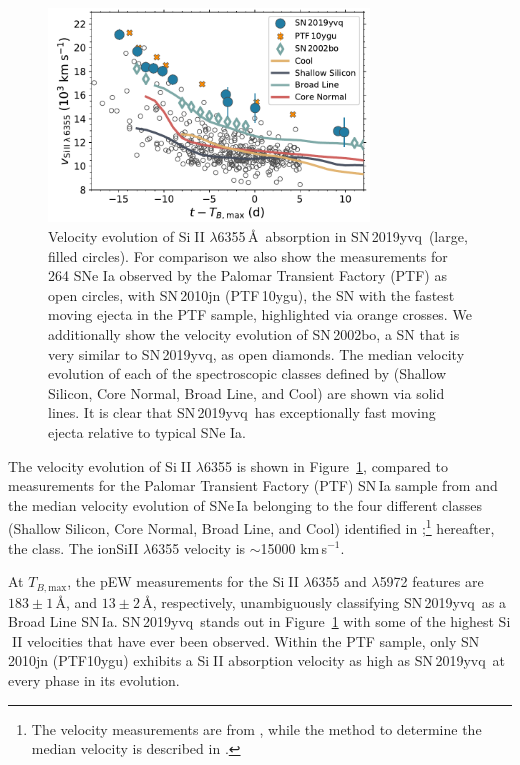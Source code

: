 \documentclass[twocolumn]{aastex63}
\def\ion#1#2{#1$\;${\footnotesize\rm{#2}}\relax}
\newcommand{\tbmax}{$T_{B,\mathrm{max}}$}
\newcommand{\kms}{km\,s$^{-1}$}
\newcommand{\sn}{SN\,2019yvq}
\begin{document}
\begin{figure}
    \centering
    \includegraphics[width=3.35in]{./figures/vel_evolution.pdf}
    \caption{Velocity evolution of \ion{Si}{II} $\lambda$6355\,\AA\ absorption
    in \sn\ (large, filled circles). For comparison we also show the
    measurements for 264 SNe Ia observed by the Palomar Transient Factory
    (PTF) as open circles, with SN\,2010jn (PTF\,10ygu), the SN with the
    fastest moving ejecta in the PTF sample, highlighted via orange crosses.
    We additionally show the velocity evolution of SN\,2002bo, a SN that is
    very similar to \sn, as open diamonds. The median velocity evolution of
    each of the spectroscopic classes defined by \citet{Branch06} (Shallow
    Silicon, Core Normal, Broad Line, and Cool) are shown via solid lines. It
    is clear that \sn\ has exceptionally fast moving ejecta relative to
    typical SNe Ia.}
    \label{fig:vel_evo}
\end{figure}

The velocity evolution of \ion{Si}{II} $\lambda$6355 is shown in
Figure~\ref{fig:vel_evo}, compared to measurements for the Palomar Transient
Factory (PTF) SN\,Ia sample from \citet{Maguire14} and the median velocity
evolution of SNe\,Ia belonging to the four different classes (Shallow Silicon,
Core Normal, Broad Line, and Cool) identified in
\citet{Branch06};\footnote{The velocity measurements are from
\citet{Blondin12}, while the method to determine the median velocity is
described in \citet{Miller18}.} hereafter, the \citeauthor{Branch06} class. 
The ion{Si}{II} $\lambda$6355 velocity is $\sim$15000 \kms.  

At \tbmax, the pEW measurements for the \ion{Si}{II} $\lambda$6355 and
$\lambda$5972 features are $183\pm1$\,\AA, and $13\pm2$\,\AA, respectively,
unambiguously classifying \sn\ as a \citeauthor{Branch06} Broad Line SN\,Ia.
\sn\ stands out in Figure~\ref{fig:vel_evo} with some of the highest
\ion{Si}{II} velocities that have ever been observed. Within the PTF sample,
only SN\,2010jn (PTF10ygu) exhibits a \ion{Si}{II} absorption velocity as high
as \sn\ at every phase in its evolution.
\end{document}
